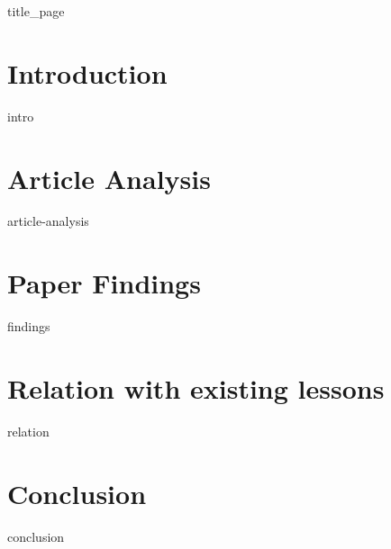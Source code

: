 \documentclass[a4paper, 12pt]{article}
\begin{document}
{title_page}

\newpage
\tableofcontents
\newpage

\section{Introduction}
{intro}

\section{Article Analysis}
{article-analysis}

\newpage
\section{Paper Findings}
{findings}

\newpage
\section{Relation with existing lessons}
{relation}

\newpage
\section{Conclusion}
{conclusion}

\newpage
\printbibliography

\printindex
\end{document}
